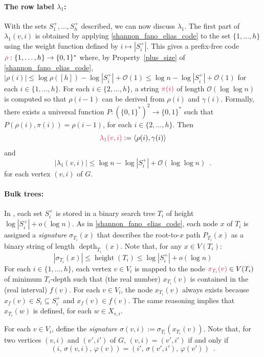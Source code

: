 \documentclass{patmorin}
\makeatletter
\renewcommand{\le}{\leqslant}
\newcommand{\defin}[1]{\emph{\textcolor{brightmaroon}{#1}}}
\def\mathcolor#1#{\@mathcolor{#1}}
\def\@mathcolor#1#2#3{%
  \protect\leavevmode
  \begingroup
    \color#1{#2}#3%
  \endgroup
}
\newcommand{\mathdefin}[1]{\mathcolor{brightmaroon}{#1}}
\DeclareMathOperator{\height}{height}
\DeclareMathOperator{\depth}{depth}
\newcommand{\Oh}{\mathcal{O}}
\makeatother
\begin{document}
  \paragraph{\boldmath The row label $\lambda_1$:}
  With the sets $S^+_1,\ldots,S^+_h$ described, we can now discuss $\lambda_1$.
  The first part of $\lambda_1(v,i)$ is obtained by applying \cref{shannon_fano_elias_code} to the set $\{1,\ldots,h\}$ using the weight function defined by $i \mapsto |S^+_i|$. This gives a prefix-free code $\mathdefin{\rho}:\{1,\ldots,h\}\to\{0,1\}^*$ where, by Property~\ref{plus_size} of \cref{shannon_fano_elias_code}, $|\rho(i)|\le \log\rho([h]) - \log|S^+_i| + \Oh(1)\le \log n - \log|S^+_i| + \Oh(1)$ for each $i\in\{1,\ldots,h\}$.
  For each $i\in\{2,\ldots,h\}$, a string $\mathdefin{\pi(i)}$ of length $\Oh(\log\log n)$ is computed so that $\rho(i-1)$ can be derived from $\rho(i)$ and $\gamma(i)$.  Formally, there exists a universal function $P:(\{0,1\}^*)^2\to\{0,1\}^*$ such that $P(\rho(i),\pi(i))=\rho(i-1)$, for each $i\in\{2,\ldots,h\}$.
  Then
  \[
     \mathdefin{\lambda_1(v,i)}:=\langle \rho(i),\gamma(i)\rangle
  \]
  and 
  \begin{equation}  
    |\lambda_1(v,i)|\le \log n - \log |S^+_i| + \Oh(\log\log n) \enspace .
    \label{lambda_one_length}
  \end{equation}
  for each vertex $(v,i)$ of $G$.


  \paragraph{Bulk trees:}
  In \cite{dujmovic.esperet.ea:adjacency}, each set $S^+_i$ is stored in a binary search tree $T_i$ of height $\log|S^+_i|+o(\log n)$.
  As in \cref{shannon_fano_elias_code}, each node $x$ of $T_i$ is assigned a \defin{signature} \defin{$\sigma_{T_i}(x)$} that describes the root-to-$x$ path $P_{T_i}(x)$ as a binary string of length $\depth_{T_i}(x)$.
  Note that, for any $x\in V(T_i)$:
  \[
    |\sigma_{T_i}(x)| \le \height(T_i) \le \log|S^+_i|+o(\log n)
  \]
  For each $i\in\{1,\ldots,h\}$, each vertex $v\in V_i$ is mapped to the node $\mathdefin{x_{T_i}(v)}\in V(T_i)$ of minimum $T_i$-depth such that (the real number) $x_{T_i}(v)$ is contained in the (real interval) $f(v)$.
  For each $v\in V_i$, the node $x_{T_i}(v)$ always exists because $x_f(v)\in S_i\subseteq S_i^+$ and $x_f(v)\in f(v)$.  The same reasoning implies that $x_{T_i}(w)$ is defined, for each $w\in X_{v,i}$.



  For each $v\in V_i$, define the \defin{signature} $\sigma(v,i):=\sigma_{T_i}(x_{T_i}(v))$.  Note that, for two vertices $(v,i)$ and $(v',i')$ of $G$, $(v,i)=(v',i')$ if and only if
  \begin{equation}
     (i,\,\sigma(v,i),\,\varphi(v)) = (i',\,\sigma(v',i'),\,\varphi(v')) \enspace .
     \label{ps_identity}
  \end{equation}
\end{document}
